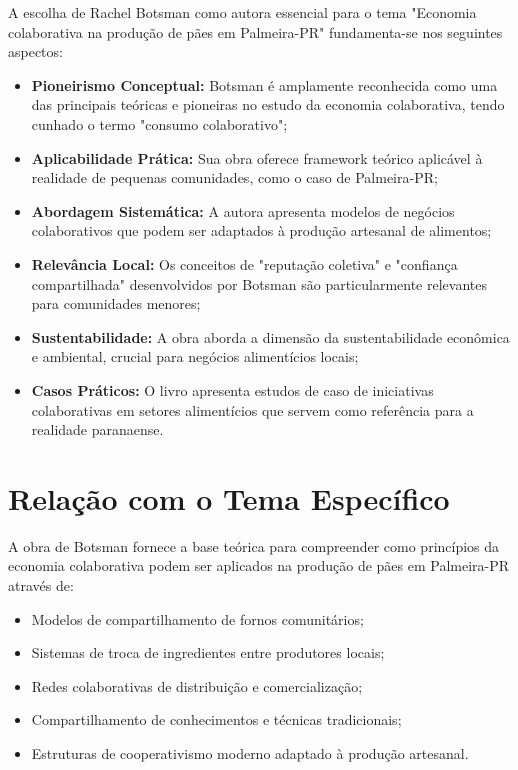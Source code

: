 \documentclass[12pt, a4paper]{article}
\begin{document}
A escolha de Rachel Botsman como autora essencial para o tema "Economia colaborativa na produção de pães em Palmeira-PR" fundamenta-se nos seguintes aspectos:

\begin{itemize}[leftmargin=*, nosep]
    \item \textbf{Pioneirismo Conceptual:} Botsman é amplamente reconhecida como uma das principais teóricas e pioneiras no estudo da economia colaborativa, tendo cunhado o termo "consumo colaborativo";
    
    \item \textbf{Aplicabilidade Prática:} Sua obra oferece framework teórico aplicável à realidade de pequenas comunidades, como o caso de Palmeira-PR;
    
    \item \textbf{Abordagem Sistemática:} A autora apresenta modelos de negócios colaborativos que podem ser adaptados à produção artesanal de alimentos;
    
    \item \textbf{Relevância Local:} Os conceitos de "reputação coletiva" e "confiança compartilhada" desenvolvidos por Botsman são particularmente relevantes para comunidades menores;
    
    \item \textbf{Sustentabilidade:} A obra aborda a dimensão da sustentabilidade econômica e ambiental, crucial para negócios alimentícios locais;
    
    \item \textbf{Casos Práticos:} O livro apresenta estudos de caso de iniciativas colaborativas em setores alimentícios que servem como referência para a realidade paranaense.
\end{itemize}

\section{Relação com o Tema Específico}

A obra de Botsman fornece a base teórica para compreender como princípios da economia colaborativa podem ser aplicados na produção de pães em Palmeira-PR através de:

\begin{itemize}[leftmargin=*, nosep]
    \item Modelos de compartilhamento de fornos comunitários;
    \item Sistemas de troca de ingredientes entre produtores locais;
    \item Redes colaborativas de distribuição e comercialização;
    \item Compartilhamento de conhecimentos e técnicas tradicionais;
    \item Estruturas de cooperativismo moderno adaptado à produção artesanal.
\end{itemize}
\end{document}
